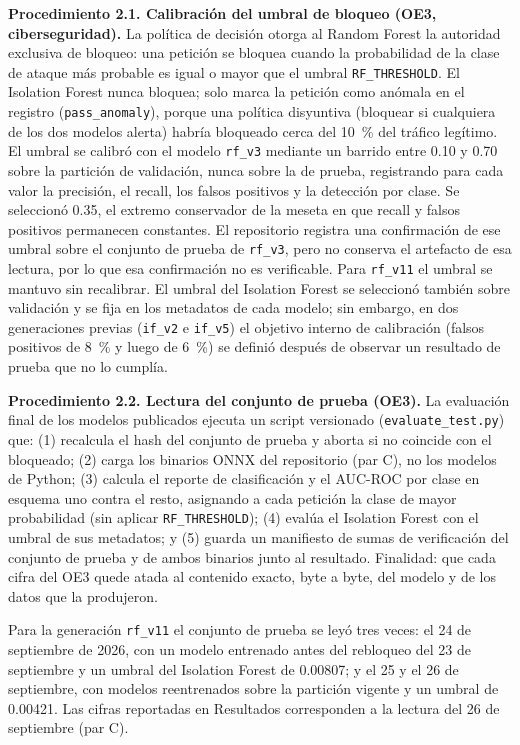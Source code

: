 \textbf{Procedimiento 2.1. Calibración del umbral de bloqueo (OE3, ciberseguridad).} La
política de decisión otorga al Random Forest la autoridad exclusiva de bloqueo: una petición se
bloquea cuando la probabilidad de la clase de ataque más probable es igual o mayor que el umbral
\texttt{RF\_THRESHOLD}. El Isolation Forest nunca bloquea; solo marca la petición como anómala
en el registro (\texttt{pass\_anomaly}), porque una política disyuntiva (bloquear si cualquiera
de los dos modelos alerta) habría bloqueado cerca del 10~\% del tráfico legítimo. El umbral se
calibró con el modelo \texttt{rf\_v3} mediante un barrido entre 0.10 y 0.70 sobre la partición
de validación, nunca sobre la de prueba, registrando para cada valor la precisión, el recall, los
falsos positivos y la detección por clase. Se seleccionó 0.35, el extremo conservador de la
meseta en que recall y falsos positivos permanecen constantes. El repositorio registra una
confirmación de ese umbral sobre el conjunto de prueba de \texttt{rf\_v3}, pero no conserva el
artefacto de esa lectura, por lo que esa confirmación no es verificable. Para \texttt{rf\_v11} el
umbral se mantuvo sin recalibrar. El umbral del Isolation Forest se seleccionó también sobre
validación y se fija en los metadatos de cada modelo; sin embargo, en dos generaciones previas
(\texttt{if\_v2} e \texttt{if\_v5}) el objetivo interno de calibración (falsos positivos de 8~\% y
luego de 6~\%) se definió después de observar un resultado de prueba que no lo cumplía.

\textbf{Procedimiento 2.2. Lectura del conjunto de prueba (OE3).} La evaluación final de los
modelos publicados ejecuta un script versionado (\texttt{evaluate\_test.py}) que: (1) recalcula el
hash del conjunto de prueba y aborta si no coincide con el bloqueado; (2) carga los binarios ONNX
del repositorio (par C), no los modelos de Python; (3) calcula el reporte de clasificación y el AUC-ROC
por clase en esquema uno contra el resto, asignando a cada petición la clase de mayor
probabilidad (sin aplicar \texttt{RF\_THRESHOLD}); (4) evalúa el Isolation Forest con el umbral de
sus metadatos; y (5) guarda un manifiesto de sumas de verificación del conjunto de prueba y de
ambos binarios junto al resultado. Finalidad: que cada cifra del OE3 quede atada al contenido
exacto, byte a byte, del modelo y de los datos que la produjeron.

Para la generación \texttt{rf\_v11} el conjunto de prueba se leyó tres veces: el 24 de septiembre
de 2026, con un modelo entrenado antes del rebloqueo del 23 de septiembre y un umbral del
Isolation Forest de 0.00807; y el 25 y el 26 de septiembre, con modelos reentrenados sobre la
partición vigente y un umbral de 0.00421. Las cifras reportadas en Resultados corresponden a la
lectura del 26 de septiembre (par C).

